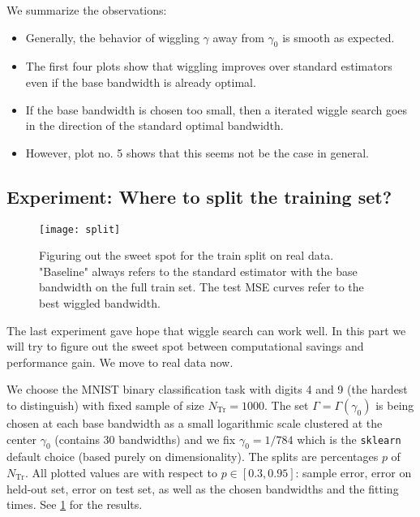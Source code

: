 \documentclass[12pt]{amsart}
\DeclareMathOperator{\Tr}{Tr}
\begin{document}
We summarize the observations:
\begin{itemize}
    \item Generally, the behavior of wiggling $\gamma$ away from $\gamma_0$
        is smooth as expected.
    \item The first four plots show that wiggling improves over standard
        estimators even if the base bandwidth is already optimal.
    \item If the base bandwidth is chosen too small, then a iterated 
        wiggle search goes in the direction of the standard optimal bandwidth.
    \item However, plot no. 5 shows that this seems not be the case in general.
\end{itemize}

\subsection{Experiment: Where to split the training set?}

\begin{figure}[htp]
    \centering
    \texttt{[image: split]}
    \caption{
        Figuring out the sweet spot for the train split on real data.
        "Baseline" always refers to the standard estimator with the 
        base bandwidth on the full train set.
        The test MSE curves refer to the best wiggled bandwidth. }
    \label{fig:split}
\end{figure}

The last experiment gave hope that wiggle search can work well.
In this part we will try to figure out the sweet spot between computational
savings and performance gain.
We move to real data now.

We choose the MNIST binary classification task with digits 4 and 9
(the hardest to distinguish) with fixed sample of size $N_{\Tr} = 1000$.
The set $\Gamma = \Gamma(\gamma_0)$ is being chosen at each base bandwidth
as a small logarithmic scale clustered at the center $\gamma_0$ 
(contains 30 bandwidths) and we fix $\gamma_0 = 1/784$ which is the 
\texttt{sklearn} default choice (based purely on dimensionality).
The splits are percentages $p$ of $N_{\Tr}$.
All plotted values are with respect to $p \in [0.3, 0.95]$:
sample error, error on held-out set, error on test set, as well as the 
chosen bandwidths and the fitting times.
See \cref{fig:split} for the results.
\end{document}

